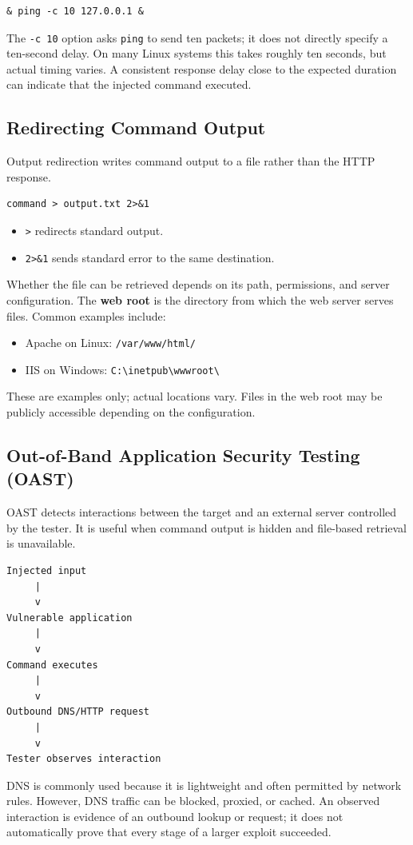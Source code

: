 \documentclass[12pt,a4paper]{article}
\newcommand{\nsubsection}[1]{\subsection{#1}}
\begin{document}
\begin{lstlisting}
& ping -c 10 127.0.0.1 &
\end{lstlisting}

The \texttt{-c 10} option asks \texttt{ping} to send ten packets;
it does not directly specify a ten-second delay. On many Linux
systems this takes roughly ten seconds, but actual timing varies.
A consistent response delay close to the expected duration can
indicate that the injected command executed.

\vspace{0.4cm}
\nsubsection{Redirecting Command Output}

Output redirection writes command output to a file rather than
the HTTP response.

\begin{lstlisting}
command > output.txt 2>&1
\end{lstlisting}

\begin{itemize}
    \item \texttt{>} redirects standard output.
    \item \texttt{2>\&1} sends standard error to the same destination.
\end{itemize}

Whether the file can be retrieved depends on its path, permissions,
and server configuration.
The \textbf{web root} is the directory from which the web server
serves files. Common examples include:

\begin{itemize}
    \item Apache on Linux: \texttt{/var/www/html/}
    \item IIS on Windows: \texttt{C:\textbackslash inetpub\textbackslash wwwroot\textbackslash}
\end{itemize}

These are examples only; actual locations vary. Files in the web
root may be publicly accessible depending on the configuration.

\newpage
\nsubsection{Out-of-Band Application Security Testing (OAST)}

OAST detects interactions between the target and an external
server controlled by the tester. It is useful when command output
is hidden and file-based retrieval is unavailable.

\begin{lstlisting}
Injected input
     |
     v
Vulnerable application
     |
     v
Command executes
     |
     v
Outbound DNS/HTTP request
     |
     v
Tester observes interaction

\end{lstlisting}
DNS is commonly used because it is lightweight and often permitted
by network rules. However, DNS traffic can be blocked, proxied,
or cached.
An observed interaction is evidence of an outbound lookup or
request; it does not automatically prove that every stage of a
larger exploit succeeded.
\end{document}
